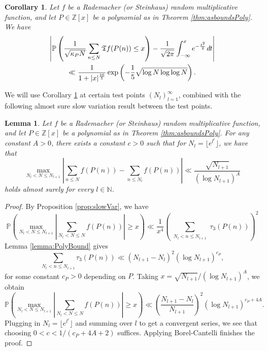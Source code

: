 \documentclass[11pt]{tran-l}
\newtheorem{lemma}[theorem]{Lemma}
\newtheorem{cor}[theorem]{Corollary}
\theoremstyle{definition}
\theoremstyle{remark}
\numberwithin{equation}{section}
\begin{document}
\begin{cor}\label{cor:quantCLTpoly}
    Let $f$ be a Rademacher (or Steinhaus) random multiplicative function, and let $P\in\mathbb Z[x]$ be a polynomial as in Theorem \ref{thm:asboundsPoly}. We have
     \begin{multline*}
\left\lvert\mathbb P\left(\frac{1}{\sqrt{\kappa_P N}}\sum_{n\leq N}\mathfrak T f(P(n))\leq x \right) - \frac{1}{\sqrt{2\pi}}\int_{-\infty}^x e^{-\frac{t^2}{2}}\emph{d}t\right\rvert \\ \ll \frac{1}{1+\lvert x\rvert^{\frac{16}{5}}}\exp\left(-\frac{1}{5} \sqrt{\log N\log\log N}\right).
    \end{multline*}
\end{cor}

We will use Corollary \ref{cor:quantCLTpoly} at certain test points $(N_l)_{l=1}^\infty$, combined with the following almost sure slow variation result between the test points.

\begin{lemma}\label{lemma:slowVarPoly} Let $f$ be a Rademacher (or Steinhaus) random multiplicative function, and let $P\in\mathbb Z[x]$ be a polynomial as in Theorem \ref{thm:asboundsPoly}. 
For any constant $A>0$, there exists a constant $c>0$ such that for $N_l = \lfloor e^{l^c}\rfloor$, we have that
    \begin{equation*}
        \max_{N_{l}<N\leq N_{l+1}} \left\lvert\sum_{n\leq N} f(P(n)) - \sum_{n\leq N_{l}} f(P(n)) \right\rvert \ll \frac{\sqrt{N_{l+1}}}{(\log N_{l+1})^A}
    \end{equation*} holds almost surely for every $l\in\mathbb N$. 
\end{lemma}

\begin{proof}
    By Proposition \ref{prop:slowVar}, we have 
\begin{equation*}
\mathbb P\left(\max_{N_l<N\leq N_{l+1}}\left\lvert\sum_{N_l<N\leq N}f(P(n))\right\rvert\geq x\right) \ll \frac{1}{x^4} \left(\sum_{\substack{N_l<n\leq N_{l+1} }} \tau_3(P(n))\right)^2 
\end{equation*}
Lemma \ref{lemma:PolyBound} gives 
\begin{equation*}
        \sum_{N_l<n\leq N_{l+1}} \tau_{3}(P(n)) \ll (N_{l+1} - N_l)^2(\log N_{l+1})^{c_P},
    \end{equation*} 
    for some constant $c_P>0$ depending on $P$. Taking $x = \sqrt{N_{l+1}}/(\log N_{l+1})^A$, we obtain 
    \begin{equation*}
        \mathbb P\left(\max_{N_l<N\leq N_{l+1}}\left\lvert\sum_{N_l<N\leq N}f(P(n))\right\rvert\geq x\right) \ll \left(\frac{N_{l+1} - N_l}{N_{l+1}} \right)^2 (\log N_{l+1})^{c_P +4A}.
    \end{equation*}
Plugging in $N_l = \lfloor e^{l^c}\rfloor$ and summing over $l$ to get a convergent series, we see that choosing $0<c<1/({c_P+4A+2})$ suffices. Applying Borel-Cantelli finishes the proof.
\end{proof} 
\end{document}
